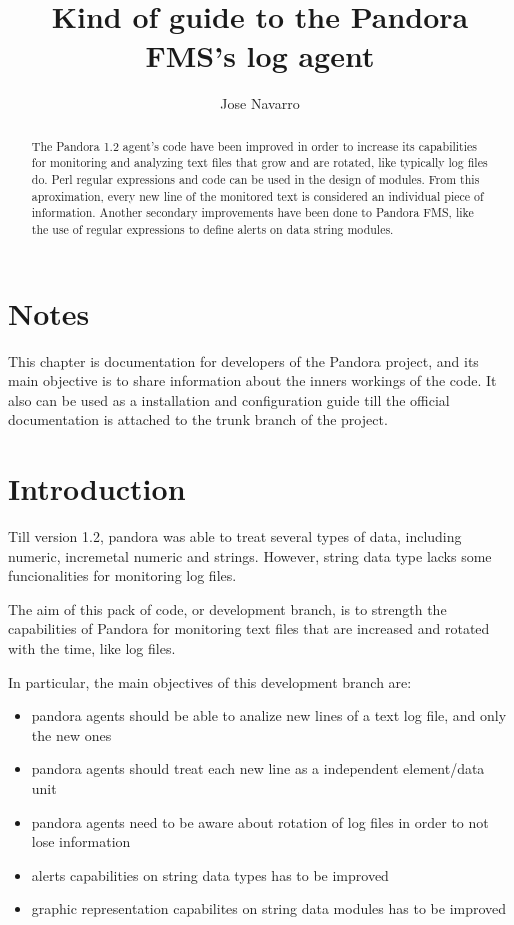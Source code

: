 \documentclass[a4paper,10pt]{article}
\title{Kind of guide to the Pandora FMS's log agent}
\author{Jose Navarro}
\begin{document}
\maketitle

\tableofcontents

\pagebreak

\begin{abstract}
The Pandora 1.2 agent's code have been improved in order to increase its capabilities for monitoring and analyzing text files that grow and are rotated, like typically log files do. Perl regular expressions and code can be used in the design of modules. From this aproximation, every new line of the monitored text is considered an individual piece of information. Another secondary improvements have been done to Pandora FMS, like the use of regular expressions to define alerts on data string modules.
\end{abstract}

\section{Notes}

This chapter is documentation for developers of the Pandora project, and its main objective is to share information about the inners workings of the code. It also can be used as a installation and configuration guide till the official documentation is attached to the trunk branch of the project.
\section{Introduction}

      Till version 1.2, pandora was able to treat several types
      of data, including numeric, incremetal numeric and strings. However,
      string data type lacks some funcionalities for monitoring log files.

      The aim of this pack of code, or development branch, is to strength
      the capabilities of Pandora for monitoring text files that are
      increased and rotated with the time, like log files.

      In particular, the main objectives of this development branch are:

\begin{itemize}
\item 	    pandora agents should be able to analize new lines of a
	    text log file, and only the new ones
\item 	    pandora agents should treat each new line as a independent
	    element/data unit
\item 	    pandora agents need to be aware about rotation of log files
	    in order to not lose information
\item   alerts capabilities on string data types has to be improved
\item   graphic representation capabilites on string data modules has
	    to be improved
\end{itemize}
\end{document}
